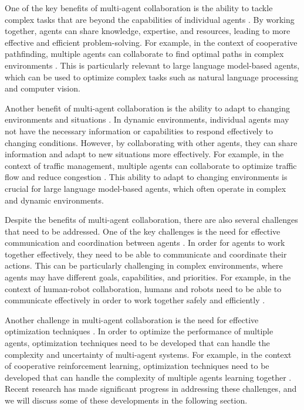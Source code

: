 \documentclass[11pt]{article}
\begin{document}
One of the key benefits of multi-agent collaboration is the ability to tackle complex tasks that are beyond the capabilities of individual agents \cite{ref174}. By working together, agents can share knowledge, expertise, and resources, leading to more effective and efficient problem-solving. For example, in the context of cooperative pathfinding, multiple agents can collaborate to find optimal paths in complex environments \cite{ref175}. This is particularly relevant to large language model-based agents, which can be used to optimize complex tasks such as natural language processing and computer vision.

Another benefit of multi-agent collaboration is the ability to adapt to changing environments and situations \cite{ref176}. In dynamic environments, individual agents may not have the necessary information or capabilities to respond effectively to changing conditions. However, by collaborating with other agents, they can share information and adapt to new situations more effectively. For example, in the context of traffic management, multiple agents can collaborate to optimize traffic flow and reduce congestion \cite{ref177}. This ability to adapt to changing environments is crucial for large language model-based agents, which often operate in complex and dynamic environments.

Despite the benefits of multi-agent collaboration, there are also several challenges that need to be addressed. One of the key challenges is the need for effective communication and coordination between agents \cite{ref178}. In order for agents to work together effectively, they need to be able to communicate and coordinate their actions. This can be particularly challenging in complex environments, where agents may have different goals, capabilities, and priorities. For example, in the context of human-robot collaboration, humans and robots need to be able to communicate effectively in order to work together safely and efficiently \cite{ref179}.

Another challenge in multi-agent collaboration is the need for effective optimization techniques \cite{ref180}. In order to optimize the performance of multiple agents, optimization techniques need to be developed that can handle the complexity and uncertainty of multi-agent systems. For example, in the context of cooperative reinforcement learning, optimization techniques need to be developed that can handle the complexity of multiple agents learning together \cite{ref181}. Recent research has made significant progress in addressing these challenges, and we will discuss some of these developments in the following section.
\end{document}
